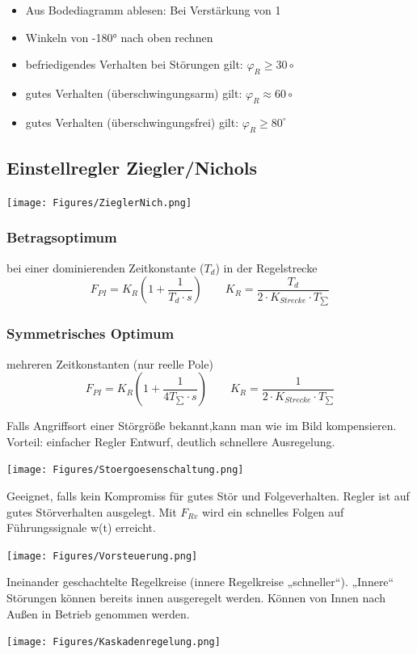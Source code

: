 \begin{itemize}[leftmargin=*]
	\item[] Aus Bodediagramm ablesen: Bei Verstärkung von 1
	\item[] Winkeln von -180° nach oben rechnen
	\item befriedigendes Verhalten bei Störungen gilt: $\varphi _R \geq 30\circ$
	\item gutes Verhalten (überschwingungsarm) gilt: $\varphi _R \approx  60\circ$
	\item gutes Verhalten (überschwingungsfrei) gilt: $\varphi _R \geq 80^\circ$
\end{itemize}

\subsection{Einstellregler Ziegler/Nichols}
{\centering
\texttt{[image: Figures/ZieglerNich.png]}}

\subsubsection{Betragsoptimum}
bei einer dominierenden  Zeitkonstante ($T_d$) in der Regelstrecke
\[
	F_{PI} = K_R \left(1 + \dfrac{1}{T_d \cdot s}\right) \qquad K_R =\dfrac{T_d}{2 \cdot K_{Strecke} \cdot T_{\sum}}
\]

\subsubsection{Symmetrisches Optimum}
mehreren Zeitkonstanten (nur reelle Pole)
\[
	F_{PI} = K_R \left(1 + \dfrac{1}{4T_{\sum} \cdot s}\right) \qquad K_R =\dfrac{1}{2 \cdot K_{Strecke} \cdot T_{\sum}}
\]

\raggedright
\begin{mdframed}[style=exercise, frametitle=Störgrößenaufschaltung:]
	Falls Angriffsort einer Störgröße bekannt,kann man wie im Bild kompensieren.
	Vorteil: einfacher Regler Entwurf, deutlich schnellere Ausregelung.
\end{mdframed}

\texttt{[image: Figures/Stoergoesenschaltung.png]}


\begin{mdframed}[style=exercise, frametitle=Vorsteuerung:]
	Geeignet, falls kein Kompromiss für gutes Stör und Folgeverhalten.
	Regler ist auf gutes Störverhalten ausgelegt. Mit $F_{Rv}$ wird ein schnelles Folgen
	auf Führungssignale w(t) erreicht.
\end{mdframed}

\texttt{[image: Figures/Vorsteuerung.png]}


\begin{mdframed}[style=exercise, frametitle=Kaskadenregelung:]
	Ineinander geschachtelte Regelkreise (innere Regelkreise „schneller“). „Innere“
	Störungen können bereits innen ausgeregelt werden. Können von Innen nach Außen in Betrieb genommen werden.
\end{mdframed}

\texttt{[image: Figures/Kaskadenregelung.png]}

\newpage